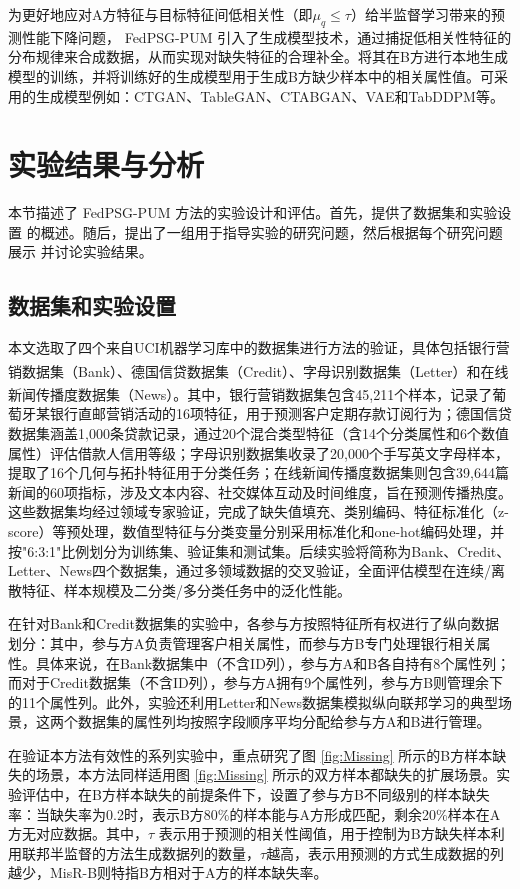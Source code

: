 为更好地应对A方特征与目标特征间低相关性（即$\mu_q \leq \tau$）给半监督学习带来的预测性能下降问题， FedPSG-PUM 引入了生成模型技术，通过捕捉低相关性特征的分布规律来合成数据，从而实现对缺失特征的合理补全。将其在B方进行本地生成模型的训练，并将训练好的生成模型用于生成B方缺少样本中的相关属性值。可采用的生成模型例如：CTGAN、TableGAN、CTABGAN、VAE和TabDDPM等。
\section{实验结果与分析}
本节描述了 FedPSG-PUM 方法的实验设计和评估。首先，提供了数据集和实验设置 的概述。随后，提出了一组用于指导实验的研究问题，然后根据每个研究问题展示 并讨论实验结果。
\subsection{数据集和实验设置} \label{subsec:data_experiment}
本文选取了四个来自UCI机器学习库中的数据集进行方法的验证，具体包括银行营销数据集（Bank）、德国信贷数据集（Credit）、字母识别数据集（Letter）\textsuperscript{\cite{serbian}}和在线新闻传播度数据集（News）\textsuperscript{\cite{news}}。其中，银行营销数据集包含45,211个样本，记录了葡萄牙某银行直邮营销活动的16项特征，用于预测客户定期存款订阅行为；德国信贷数据集涵盖1,000条贷款记录，通过20个混合类型特征（含14个分类属性和6个数值属性）评估借款人信用等级；字母识别数据集收录了20,000个手写英文字母样本，提取了16个几何与拓扑特征用于分类任务；在线新闻传播度数据集则包含39,644篇新闻的60项指标，涉及文本内容、社交媒体互动及时间维度，旨在预测传播热度。这些数据集均经过领域专家验证，完成了缺失值填充、类别编码、特征标准化（z-score）等预处理，数值型特征与分类变量分别采用标准化和one-hot编码处理，并按"6:3:1"比例划分为训练集、验证集和测试集。后续实验将简称为Bank、Credit、Letter、News四个数据集，通过多领域数据的交叉验证，全面评估模型在连续/离散特征、样本规模及二分类/多分类任务中的泛化性能。

在针对Bank和Credit数据集的实验中，各参与方按照特征所有权进行了纵向数据划分：其中，参与方A负责管理客户相关属性，而参与方B专门处理银行相关属性。具体来说，在Bank数据集中（不含ID列），参与方A和B各自持有8个属性列；而对于Credit数据集（不含ID列），参与方A拥有9个属性列，参与方B则管理余下的11个属性列。此外，实验还利用Letter和News数据集模拟纵向联邦学习的典型场景，这两个数据集的属性列均按照字段顺序平均分配给参与方A和B进行管理。

在验证本方法有效性的系列实验中，重点研究了图 \ref{fig:Missing} 所示的B方样本缺失的场景，本方法同样适用图 \ref{fig:Missing} 所示的双方样本都缺失的扩展场景。实验评估中，在B方样本缺失的前提条件下，设置了参与方B不同级别的样本缺失率：当缺失率为0.2时，表示B方80\%的样本能与A方形成匹配，剩余20\%样本在A方无对应数据。其中，$\tau$ 表示用于预测的相关性阈值，用于控制为B方缺失样本利用联邦半监督的方法生成数据列的数量，$\tau$越高，表示用预测的方式生成数据的列越少，MisR-B则特指B方相对于A方的样本缺失率。
